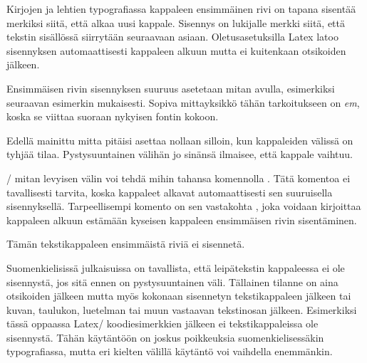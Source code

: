 Kirjojen ja lehtien typografiassa kappaleen ensimmäinen rivi on tapana
sisentää merkiksi siitä, että alkaa uusi kappale. Sisennys on lukijalle
merkki siitä, että tekstin sisällössä siirrytään seuraavaan asiaan.
Oletusasetuksilla Latex latoo sisennyksen automaattisesti kappaleen
alkuun mutta ei kuitenkaan otsikoiden jälkeen.

Ensimmäisen rivin sisennyksen suuruus asetetaan mitan 
avulla, esimerkiksi seuraavan esimerkin mukaisesti. Sopiva mittayksikkö
tähän tarkoitukseen on \emph{em}, koska se viittaa suoraan nykyisen
fontin kokoon.

\begin{koodilohkosis}
\setlength{\parindent}{1em}
\end{koodilohkosis}

Edellä mainittu mitta pitäisi asettaa nollaan silloin, kun kappaleiden
välissä on tyhjää tilaa. Pystysuuntainen välihän jo sinänsä ilmaisee,
että kappale vaihtuu.

\begin{koodilohkosis}
\setlength{\parskip}{1.3ex plus .2ex minus .1ex}
\setlength{\parindent}{0em}  %
\end{koodilohkosis}

\-/ mitan levyisen välin voi tehdä mihin tahansa
komennolla . Tätä komentoa ei tavallisesti tarvita,
koska kappaleet alkavat automaattisesti sen suuruisella sisennyksellä.
Tarpeellisempi komento on sen vastakohta , joka
voidaan kirjoittaa kappaleen alkuun estämään kyseisen kappaleen
ensimmäisen rivin sisentäminen.

\begin{koodilohkosis}
\noindent
Tämän tekstikappaleen ensimmäistä riviä ei sisennetä.
\end{koodilohkosis}

Suomenkielisissä julkaisuissa on tavallista, että leipätekstin
kappaleessa ei ole sisennystä, jos sitä ennen on pystysuuntainen väli.
Tällainen tilanne on aina otsikoiden jälkeen mutta myös kokonaan
sisennetyn tekstikappaleen jälkeen tai kuvan, taulukon, luetelman tai
muun vastaavan tekstinosan jälkeen. Esimerkiksi tässä oppaassa Latex\-/
koodiesimerkkien jälkeen ei tekstikappaleissa ole sisennystä. Tähän
käytäntöön on joskus poikkeuksia suomenkielisessäkin typografiassa,
mutta eri kielten välillä käytäntö voi vaihdella enemmänkin.

